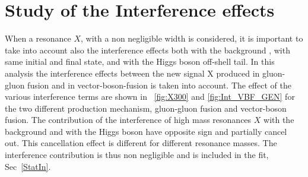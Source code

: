 \section{Study of the Interference effects}
\label{sec:interference}
When a resonance $X$, with a non negligible width is considered, it is important to take into account also the interference effects both with the \WW background , with same initial and final state, and with the Higgs boson off-shell tail. 
In this analysis  the interference effects between the
new signal X produced in gluon-gluon fusion and in vector-boson-fusion is taken into account.
The effect of the various interference terms are shown in ~\ref{fig:X300} and  \ref{fig:Int_VBF_GEN} for the two different production mechanism, gluon-gluon fusion and vector-boson fusion.  The contribution of the interference of high mass resonances $X$ with the \WW background  and with the Higgs boson have opposite sign and partially cancel out. This cancellation effect is different for different resonance masses.
The interference contribution is thus non negligible and is included in the fit, Sec~\ref{StatIn}. \\
